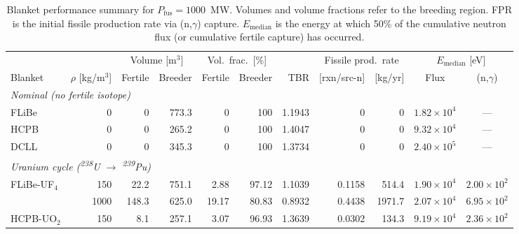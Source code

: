 
\begin{table}[htbp]
\centering
\caption{Blanket performance summary for $P_\text{fus} = 1000$~MW.
  Volumes and volume fractions refer to the breeding region.
  FPR is the initial fissile production rate via (n,$\gamma$) capture.
  $E_\text{median}$ is the energy at which 50\% of the cumulative
  neutron flux (or cumulative fertile capture) has occurred.}
\label{tab:mainresults}
\footnotesize
\setlength{\tabcolsep}{4pt}
\begin{tabular}{@{} l r rr rr r rr cc @{}}
\toprule
  &
  & \multicolumn{2}{c}{Volume [m$^3$]}
  & \multicolumn{2}{c}{Vol.\ frac.\ [\%]}
  &
  & \multicolumn{2}{c}{Fissile prod.\ rate}
  & \multicolumn{2}{c}{$E_\text{median}$ [eV]} \\
\cmidrule(lr){3-4} \cmidrule(lr){5-6} \cmidrule(lr){8-9} \cmidrule(lr){10-11}
  Blanket
  & $\rho$ [kg/m$^3$]
  & Fertile & Breeder
  & Fertile & Breeder
  & TBR
  & [rxn/src-n] & [kg/yr]
  & Flux & (n,$\gamma$) \\
\midrule
\multicolumn{11}{l}{\textit{Nominal (no fertile isotope)}} \\[2pt]
FLiBe
  &    0 &     0   & 773.3 &  0     & 100    & 1.1943 & 0      &      0 & $1.82{\times}10^4$ & ---                 \\
HCPB
  &    0 &     0   & 265.2 &  0     & 100    & 1.4047 & 0      &      0 & $9.32{\times}10^4$ & ---                 \\
DCLL
  &    0 &     0   & 345.3 &  0     & 100    & 1.3734 & 0      &      0 & $2.40{\times}10^5$ & ---                 \\
\midrule
\multicolumn{11}{l}{\textit{Uranium cycle (\textsuperscript{238}U $\to$ \textsuperscript{239}Pu)}} \\[2pt]
FLiBe-UF$_4$
  &  150 &  22.2   & 751.1 &  2.88  &  97.12 & 1.1039 & 0.1158 &  514.4 & $1.90{\times}10^4$ & $2.00{\times}10^2$ \\
  & 1000 & 148.3   & 625.0 & 19.17  &  80.83 & 0.8932 & 0.4438 & 1971.7 & $2.07{\times}10^4$ & $6.95{\times}10^2$ \\[2pt]
HCPB-UO$_2$
  &  150 &   8.1   & 257.1 &  3.07  &  96.93 & 1.3639 & 0.0302 &  134.3 & $9.19{\times}10^4$ & $2.36{\times}10^2$ \\

\end{tabular}
\end{table}
